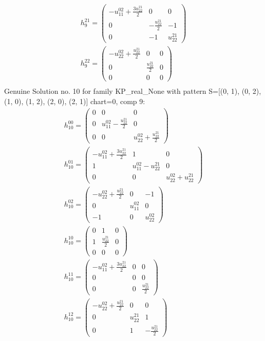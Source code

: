 \documentclass[a4paper, 11pt, twoside, onecolumn]{article}
\begin{document}
\begin{landscape}
\begin{gather*}
	 h_{9}^{21}=\begin{pmatrix}- u^{02}_{11} + \frac{3 u^{21}_{22}}{2} & 0 & 0\\0 & - \frac{u^{21}_{22}}{2} & -1\\0 & -1 & u^{21}_{22}\end{pmatrix}\\ 
	 h_{9}^{22}=\begin{pmatrix}- u^{02}_{22} + \frac{u^{21}_{22}}{2} & 0 & 0\\0 & \frac{u^{21}_{22}}{2} & 0\\0 & 0 & 0\end{pmatrix}\\ 
\end{gather*} 
Genuine Solution no. 10 for family KP_real_None with pattern S=[(0, 1), (0, 2), (1, 0), (1, 2), (2, 0), (2, 1)] chart=0, comp 9: 
\begin{gather*} 
	 h_{10}^{00}=\begin{pmatrix}0 & 0 & 0\\0 & u^{02}_{11} - \frac{u^{21}_{22}}{2} & 0\\0 & 0 & u^{02}_{22} + \frac{u^{21}_{22}}{2}\end{pmatrix}\\ 
	 h_{10}^{01}=\begin{pmatrix}- u^{02}_{11} + \frac{3 u^{21}_{22}}{2} & 1 & 0\\1 & u^{02}_{11} - u^{21}_{22} & 0\\0 & 0 & u^{02}_{22} + u^{21}_{22}\end{pmatrix}\\ 
	 h_{10}^{02}=\begin{pmatrix}- u^{02}_{22} + \frac{u^{21}_{22}}{2} & 0 & -1\\0 & u^{02}_{11} & 0\\-1 & 0 & u^{02}_{22}\end{pmatrix}\\ 
	 h_{10}^{10}=\begin{pmatrix}0 & 1 & 0\\1 & \frac{u^{21}_{22}}{2} & 0\\0 & 0 & 0\end{pmatrix}\\ 
	 h_{10}^{11}=\begin{pmatrix}- u^{02}_{11} + \frac{3 u^{21}_{22}}{2} & 0 & 0\\0 & 0 & 0\\0 & 0 & \frac{u^{21}_{22}}{2}\end{pmatrix}\\ 
	 h_{10}^{12}=\begin{pmatrix}- u^{02}_{22} + \frac{u^{21}_{22}}{2} & 0 & 0\\0 & u^{21}_{22} & 1\\0 & 1 & - \frac{u^{21}_{22}}{2}\end{pmatrix}\\ 

\end{gather*}
\end{landscape}
\end{document}
